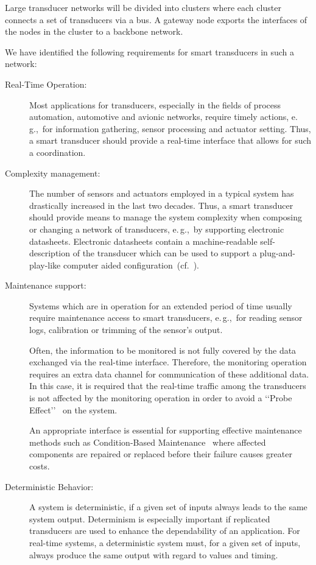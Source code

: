 \documentclass[11pt,a4paper,]{article}
\def\eg{e.\,g.,~}
\def\lqq{\lq\lq}
\def\rqq{\rq\rq}
\def\dq#1{\lqq #1\rqq}
\begin{document}
Large transducer networks will be divided into clusters where each
cluster connects a set of transducers via a bus. A gateway node
exports the interfaces of the nodes in the cluster to a backbone
network.

We have identified the following requirements for smart
transducers in such a network:

\begin{description}

\item[Real-Time Operation:] Most applications for transducers,
especially in the fields of process automation, automotive and
avionic networks, require timely actions, \eg for information
gathering, sensor processing and actuator setting. Thus, a smart
transducer should provide a real-time interface that allows for
such a coordination.

\item[Complexity management:] The number of sensors and actuators
employed in a typical system has drastically increased in the last
two decades. Thus, a smart transducer should provide means to
manage the system complexity when composing or changing a network
of transducers, \eg by supporting electronic datasheets.
Electronic datasheets contain a machine-readable self-description
of the transducer which can be used to support a
plug-and-play-like computer aided
configuration~(cf.~\cite{eccles:98}).

\item[Maintenance support:] Systems which are in operation for an
extended period of time usually require maintenance access to
smart transducers, \eg for reading sensor logs, calibration or
trimming of the sensor's output.

Often, the information to be monitored is not fully covered by the
data exchanged via the real-time interface. Therefore, the
monitoring operation requires an extra data channel for
communication of these additional data. In this case, it is
required that the real-time traffic among the transducers is not
affected by the monitoring operation in order to avoid a \dq{Probe
Effect}~\cite{gait:86,mcdowell:89} on the system.

An appropriate interface is essential for supporting effective
maintenance methods such as Condition-Based
Maintenance~\cite{bengtsson:04} where affected components are
repaired or replaced before their failure causes greater costs.

\item[Deterministic Behavior:] A system is deterministic, if a
given set of inputs always leads to the same system output.
Determinism is especially important if replicated transducers are
used to enhance the dependability of an application. For real-time
systems, a deterministic system must, for a given set of inputs,
always produce the same output with regard to values and timing.


\end{description}
\end{document}

